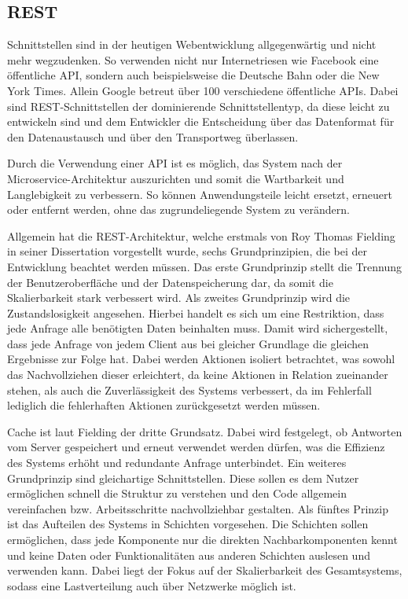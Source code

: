 
\subsection{\acf{REST}}
Schnittstellen sind in der heutigen Webentwicklung allgegenwärtig und nicht mehr wegzudenken.
So verwenden nicht nur Internetriesen wie Facebook\autocite{rf-facebook-api} eine öffentliche \ac{API}, sondern auch beispielsweise die Deutsche Bahn\autocite{rf-db-api} oder die New York Times\autocite{rf-nyt-api}.
Allein Google betreut über 100 verschiedene öffentliche \acp{API}\autocite{rf-google-api-alle}.
Dabei sind \ac{REST}-Schnittstellen der dominierende Schnittstellentyp\autocite{rf-heise-google}, da diese leicht zu entwickeln sind\autocite{rf-rodriguez2008restful} und dem Entwickler die Entscheidung über das Datenformat für den Datenaustausch und über den Transportweg überlassen\autocite{rf-graphql-heise}.

Durch die Verwendung einer \ac{API} ist es möglich, das System nach der Microservice-Architektur auszurichten und somit die Wartbarkeit und Langlebigkeit zu verbessern.
So können Anwendungsteile leicht ersetzt, erneuert oder entfernt werden, ohne das zugrundeliegende System zu verändern.\autocite{rf-fowler2015microservices}

Allgemein hat die \ac{REST}-Architektur, welche erstmals von Roy Thomas Fielding in seiner Dissertation vorgestellt wurde, sechs Grundprinzipien, die bei der Entwicklung beachtet werden müssen.
Das erste Grundprinzip stellt die Trennung der Benutzeroberfläche und der Datenspeicherung dar, da somit die Skalierbarkeit stark verbessert wird.
Als zweites Grundprinzip wird die Zustandslosigkeit angesehen. Hierbei handelt es sich um eine Restriktion, dass jede Anfrage alle benötigten Daten beinhalten muss.
Damit wird sichergestellt, dass jede Anfrage von jedem Client aus bei gleicher Grundlage die gleichen Ergebnisse zur Folge hat.
Dabei werden Aktionen isoliert betrachtet, was sowohl das Nachvollziehen dieser erleichtert, da keine Aktionen in Relation zueinander stehen, als auch die Zuverlässigkeit des Systems verbessert, da im Fehlerfall lediglich die fehlerhaften Aktionen zurückgesetzt werden müssen.

Cache ist laut Fielding der dritte Grundsatz.
Dabei wird festgelegt, ob Antworten vom Server gespeichert und erneut verwendet werden dürfen, was die Effizienz des Systems erhöht und redundante Anfrage unterbindet.
Ein weiteres Grundprinzip sind gleichartige Schnittstellen.
Diese sollen es dem Nutzer ermöglichen schnell die Struktur zu verstehen und den Code allgemein vereinfachen bzw. Arbeitsschritte nachvollziehbar gestalten.
Als fünftes Prinzip ist das Aufteilen des Systems in Schichten vorgesehen.
Die Schichten sollen ermöglichen, dass jede Komponente nur die direkten Nachbarkomponenten kennt und keine Daten oder Funktionalitäten aus anderen Schichten auslesen und verwenden kann.
Dabei liegt der Fokus auf der Skalierbarkeit des Gesamtsystems, sodass eine Lastverteilung auch über Netzwerke möglich ist.

